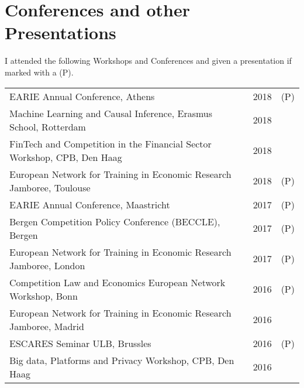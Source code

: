 \documentclass[a4paper,10pt]{article} %
\begin{document}

\section{Conferences and other Presentations }

I attended the following Workshops and Conferences and given a presentation if marked with a (P).

\begin{tabular}{p{12cm}rr}
	EARIE Annual Conference, Athens &2018 &(P)\\
	Machine Learning and Causal Inference, Erasmus School, Rotterdam &2018&\\
	FinTech and Competition in the Financial Sector Workshop, CPB, Den Haag &2018&\\
	European Network for Training in Economic Research Jamboree, Toulouse&2018 & (P)\\
	EARIE Annual Conference, Maastricht &2017 &(P)\\
	Bergen Competition Policy Conference (BECCLE), Bergen&2017 &(P)\\
	European Network for Training in Economic Research Jamboree, London&2017 &(P)\\
	Competition Law and Economics European Network Workshop, Bonn&2016 &(P)\\
	European Network for Training in Economic Research Jamboree, Madrid &2016\\
	ESCARES Seminar ULB, Brussles& 2016 &(P)\\
	Big data, Platforms and Privacy Workshop, CPB, Den Haag &2016\\
\end{tabular}


\vfill
\end{document}
